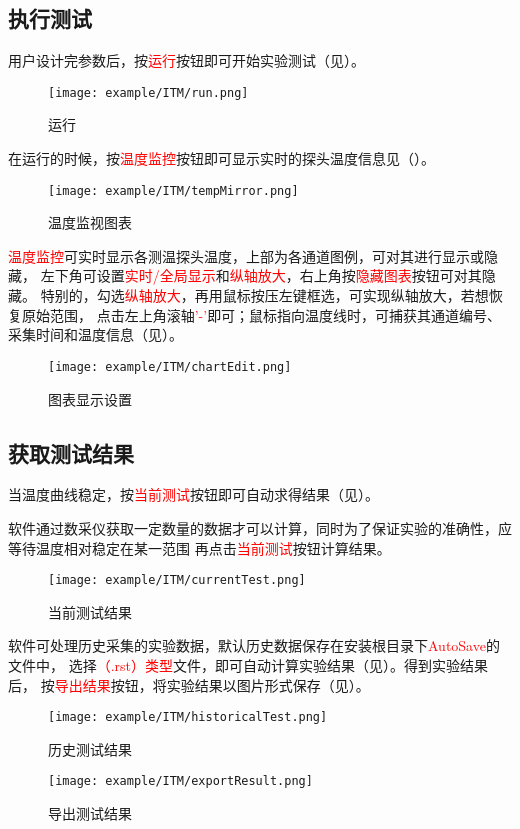 \subsection{执行测试}
用户设计完参数后，按\textcolor{red}{运行}按钮即可开始实验测试（见）。
\begin{figure}[htbp]
	\centering
	\texttt{[image: example/ITM/run.png]}
	\caption{ 运行 \label{fig:exmp_itm_run}}
\end{figure}
在运行的时候，按\textcolor{red}{温度监控}按钮即可显示实时的探头温度信息见（）。
\begin{figure}[htbp]
	\centering
	\texttt{[image: example/ITM/tempMirror.png]}
	\caption{ 温度监视图表 \label{fig:exmp_itm_tempMirror}}
\end{figure}
\textcolor{red}{温度监控}可实时显示各测温探头温度，上部为各通道图例，可对其进行显示或隐藏，
左下角可设置\textcolor{red}{实时/全局显示}和\textcolor{red}{纵轴放大}，右上角按\textcolor{red}{隐藏图表}按钮可对其隐藏。
特别的，勾选\textcolor{red}{纵轴放大}，再用鼠标按压左键框选，可实现纵轴放大，若想恢复原始范围，
点击左上角滚轴\textcolor{red}{'-'}即可；鼠标指向温度线时，可捕获其通道编号、采集时间和温度信息（见）。\\
\begin{figure}[htbp]
	\centering
	\texttt{[image: example/ITM/chartEdit.png]}
	\caption{ 图表显示设置 \label{fig:exmp_itm_chartEdit}}
\end{figure}

\subsection{获取测试结果}
	当温度曲线稳定，按\textcolor{red}{当前测试}按钮即可自动求得结果（见）。
\begin{note}
	软件通过数采仪获取一定数量的数据才可以计算，同时为了保证实验的准确性，应等待温度相对稳定在某一范围
再点击\textcolor{red}{当前测试}按钮计算结果。
\end{note}
\begin{figure}[htbp]
	\centering
	\texttt{[image: example/ITM/currentTest.png]}
	\caption{ 当前测试结果 \label{fig:exmp_itm_currentTest}}
\end{figure}
软件可处理历史采集的实验数据，默认历史数据保存在安装根目录下\textcolor{red}{AutoSave}的文件中，
选择\textcolor{red}{（.rst）类型}文件，即可自动计算实验结果（见）。得到实验结果后，
按\textcolor{red}{导出结果}按钮，将实验结果以图片形式保存（见）。
\begin{figure}[htbp]
	\centering
	\texttt{[image: example/ITM/historicalTest.png]}
	\caption{ 历史测试结果 \label{fig:exmp_itm_historicalTest}}
\end{figure}

\begin{figure}[htbp]
	\centering
	\texttt{[image: example/ITM/exportResult.png]}
	\caption{ 导出测试结果 \label{fig:exmp_itm_exportResult}}
\end{figure}